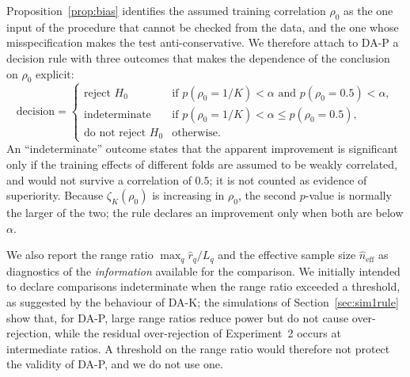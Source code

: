 Proposition~\ref{prop:bias} identifies the assumed training correlation $\rho_0$ as the one input of the procedure that cannot be checked from the data, and the one whose misspecification makes the test anti-conservative. We therefore attach to DA-P a decision rule with three outcomes that makes the dependence of the conclusion on $\rho_0$ explicit:
\begin{equation}\label{eq:rule}
\text{decision}=\begin{cases}
\text{reject } H_0 & \text{if } p(\rho_0=1/K)<\alpha \text{ and } p(\rho_0=0.5)<\alpha,\\
\text{indeterminate} & \text{if } p(\rho_0=1/K)<\alpha \le p(\rho_0=0.5),\\
\text{do not reject } H_0 & \text{otherwise.}
\end{cases}
\end{equation}
An ``indeterminate'' outcome states that the apparent improvement is significant only if the training effects of different folds are assumed to be weakly correlated, and would not survive a correlation of $0.5$; it is not counted as evidence of superiority. Because $\zeta_K(\rho_0)$ is increasing in $\rho_0$, the second $p$-value is normally the larger of the two; the rule declares an improvement only when both are below $\alpha$.

We also report the range ratio $\max_q\hat r_q/L_q$ and the effective sample size $\hat n_{\mathrm{eff}}$ as diagnostics of the \emph{information} available for the comparison. We initially intended to declare comparisons indeterminate when the range ratio exceeded a threshold, as suggested by the behaviour of DA-K; the simulations of Section~\ref{sec:sim1rule} show that, for DA-P, large range ratios reduce power but do not cause over-rejection, while the residual over-rejection of Experiment~2 occurs at intermediate ratios. A threshold on the range ratio would therefore not protect the validity of DA-P, and we do not use one.

